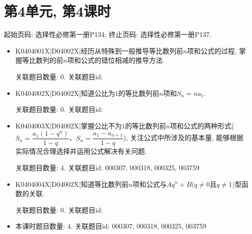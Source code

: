 \section*{第4单元, 第4课时}
起始页码: 选择性必修第一册P134; 终止页码: 选择性必修第一册P137.
\begin{itemize}
\item K0404001X|D04002X|经历从特殊到一般推导等比数列前$n$项和公式的过程, 掌握等比数列的前$n$项和公式的错位相减的推导方法.

关联题目数量: 0. 关联题目id: 

\item K0404002X|D04002X|知道公比为$1$的等比数列前$n$项和$S_{n}=na_{1}$.

关联题目数量: 0. 关联题目id: 

\item K0404003X|D04002X|掌握公比不为$1$的等比数列前$n$项和公式的两种形式($S_{n}=\dfrac{a_{1}(1-q^{n})}{1-q}$、$S_{n}=\dfrac{a_{1}-a_{n+1}}{1-q}$), 关注公式中所涉及的基本量, 能够根据实际情况合理选择并运用公式解决有关问题.

关联题目数量: 4. 关联题目id: 000307, 000318, 000325, 003759

\item K0404004X|D04002X|知道等比数列前$n$项和公式与$Aq^n+B(q\neq 0$且$q\neq 1)$型函数的关联.

关联题目数量: 0. 关联题目id: 

\item 本课时题目数量: 4. 关联题目id: 000307, 000318, 000325, 003759

\end{itemize}


